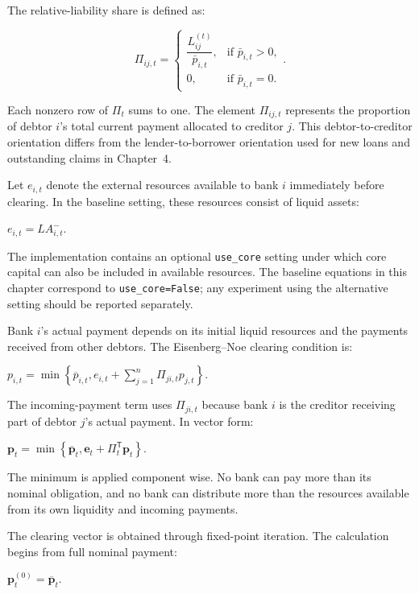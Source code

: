 The relative-liability share is defined as:


\begin{equation}
\Pi_{ij,t}=\begin{cases}\dfrac{L_{ij}^{(t)}}{\bar p_{i,t}},&\text{if }\bar p_{i,t}>0,\\[6pt]0,&\text{if }\bar p_{i,t}=0.\end{cases}\label{eq:relative-liability}.
\end{equation}


Each nonzero row of \(\Pi_{t}\) sums to one. The element
\(\Pi_{ij,t}\) represents the proportion of debtor \(i\)'s total current
payment allocated to creditor \(j\). This debtor-to-creditor orientation
differs from the lender-to-borrower orientation used for new loans and
outstanding claims in Chapter~4.

Let \(e_{i,t}\) denote the external resources available to bank
\(i\) immediately before clearing. In the baseline setting, these
resources consist of liquid assets:

\(e_{i,t} = {LA}_{i,t}^{-}\).

The implementation contains an optional \texttt{use\_core} setting under which
core capital can also be included in available resources. The baseline
equations in this chapter correspond to \texttt{use\_core=False}; any experiment
using the alternative setting should be reported separately.

Bank \(i\)'s actual payment depends on its initial liquid resources and
the payments received from other debtors. The Eisenberg--Noe clearing
condition is:

\(p_{i,t} = \min\left\{ {\overline{p}}_{i,t},e_{i,t} + \sum_{j = 1}^{n}\Pi_{ji,t}p_{j,t} \right\}\).

The incoming-payment term uses \(\Pi_{ji,t}\) because bank \(i\) is the
creditor receiving part of debtor \(j\)'s actual payment. In vector
form:

\(\mathbf{p}_{t} = \min\left\{ {\overline{\mathbf{p}}}_{t},\mathbf{e}_{t} + \Pi_{t}^{\mathsf{T}}\mathbf{p}_{t} \right\}\).

The minimum is applied component wise. No bank can pay more than its
nominal obligation, and no bank can distribute more than the resources
available from its own liquidity and incoming payments.

The clearing vector is obtained through fixed-point iteration. The
calculation begins from full nominal payment:

\(\mathbf{p}_{t}^{(0)} = {\overline{\mathbf{p}}}_{t}\).

